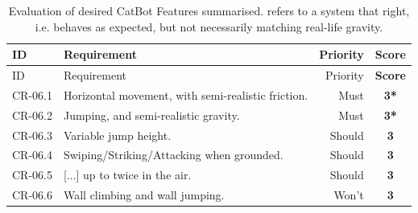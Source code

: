 \begin{center}
  \begin{longtable}{llrc}
    \caption[Evaluation of desired CatBot Features summarised]{Evaluation of desired CatBot Features summarised.  refers to a system that  right, i.e. behaves as expected, but not necessarily matching real-life gravity.} \label{tab:results/cr/autoCatFeatures} \\
    \toprule
    ID
    & Requirement
    & Priority
    & \textbf{Score} \\ \midrule
    \endfirsthead
    \toprule
    ID
    & Requirement
    & Priority
    & \textbf{Score}\\ \midrule
    \endhead
    CR-06.1
    & Horizontal movement, with semi-realistic friction.
    & Must
    & \textbf{3*}
    \\
    CR-06.2
    & Jumping, and semi-realistic gravity.
    & Must
    & \textbf{3*}
    \\
    CR-06.3
    & Variable jump height.
    & Should
    & \textbf{3}
    \\
    CR-06.4
    & Swiping/Striking/Attacking when grounded.
    & Should
    & \textbf{3}
    \\
    CR-06.5
    & [...] up to twice in the air.
    & Should
    & \textbf{3}
    \\
    CR-06.6
    & Wall climbing and wall jumping.
    & Won't
    & \textbf{3}
    \\ 
    \bottomrule
  \end{longtable}
\end{center}